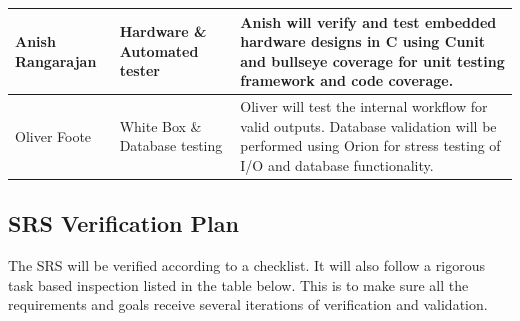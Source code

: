 \documentclass[12pt, titlepage]{article}
\begin{document}
\begin{center}
\begin{tabular}{|m{5em}|m{5em}|m{25em}|}
    \hline
    Anish Rangarajan         & Hardware \& Automated tester  & Anish will verify and test embedded hardware designs in C using Cunit and bullseye coverage for unit testing framework and code coverage.                                                                                                                      \\
    \hline
    Oliver Foote             & White Box \& Database testing & Oliver will test the internal workflow for valid outputs. Database validation will be performed using Orion for stress testing of I/O and database functionality.                                                                               \\
    \hline
  \end{tabular}

\end{center}

\pagebreak
\subsection{SRS Verification Plan}\label{SRS_verification}

The SRS will be verified according to a checklist. It will also follow a rigorous task based inspection listed in the table below. This is to make sure all the requirements and goals receive several iterations of verification and validation.
\end{document}

